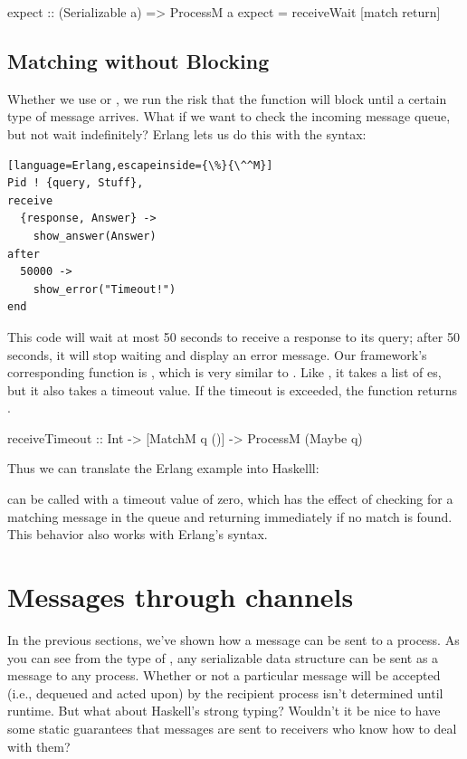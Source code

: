\documentclass[preprint]{sigplanconf}
\begin{document}
\begin{code}
expect :: (Serializable a) => ProcessM a
expect = receiveWait [match return]
\end{code}

\subsection{Matching without Blocking}

Whether we use  or , we run the risk that the function will block until a certain type of message arrives. What if we want to check the incoming message queue, but not wait indefinitely? Erlang lets us do this with the  syntax:

\begin{lstlisting}[language=Erlang,escapeinside={\%}{\^^M}]
Pid ! {query, Stuff},
receive
  {response, Answer} ->
    show_answer(Answer)
after
  50000 ->
    show_error("Timeout!")
end
\end{lstlisting}

This code will wait at most 50 seconds to receive a response to its query; after 50 seconds, it will stop waiting and display an error message. Our framework's corresponding function is , which is very similar to . Like , it takes a list of es, but it also takes a timeout value. If the timeout is exceeded, the function returns .

\begin{code}
receiveTimeout :: Int -> [MatchM q ()] -> 
											ProcessM (Maybe q)
\end{code}

\noindent
Thus we can translate the Erlang example into Haskelll:

\begin{code}
do { send pid (Query stuff)
   ; ret <- receiveTimeout 50000
       [ match(\(Response answer) -> 
            return answer)  ]
   ; case res of
       Nothing -> showError "Timeout!"
       Just ans -> showAnswer ans
\end{code}

 can be called with a timeout value of zero, which has the effect of checking for a matching message in the queue and returning immediately if no match is found. This behavior also works with Erlang's  syntax.

\section{Messages through channels}
In the previous sections, we've shown how a message can be sent to a process. As you can see from the type of , any serializable data structure can be sent as a message to any process. Whether or not a particular message will be accepted (i.e., dequeued and acted upon) by the recipient process isn't determined until runtime. But what about Haskell's strong typing? Wouldn't it be nice to have some static guarantees that messages are sent to receivers who know how to deal with them?
\end{document}
